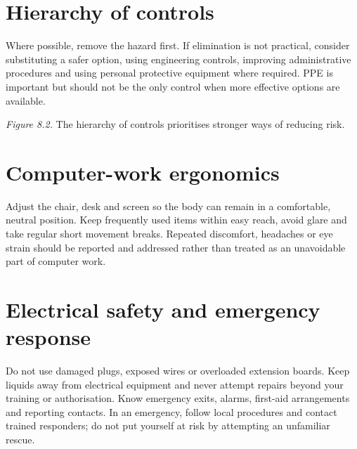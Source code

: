 \documentclass[11pt,openany,oneside]{book}
\begin{document}
\section{Hierarchy of controls}
Where possible, remove the hazard first. If elimination is not practical, consider substituting a safer option, using engineering controls, improving administrative procedures and using personal protective equipment where required. PPE is important but should not be the only control when more effective options are available.

\begin{center}
\end{center}
\textit{Figure 8.2.} The hierarchy of controls prioritises stronger ways of reducing risk.

\section{Computer-work ergonomics}
Adjust the chair, desk and screen so the body can remain in a comfortable, neutral position. Keep frequently used items within easy reach, avoid glare and take regular short movement breaks. Repeated discomfort, headaches or eye strain should be reported and addressed rather than treated as an unavoidable part of computer work.

\section{Electrical safety and emergency response}
Do not use damaged plugs, exposed wires or overloaded extension boards. Keep liquids away from electrical equipment and never attempt repairs beyond your training or authorisation. Know emergency exits, alarms, first-aid arrangements and reporting contacts. In an emergency, follow local procedures and contact trained responders; do not put yourself at risk by attempting an unfamiliar rescue.
\end{document}
